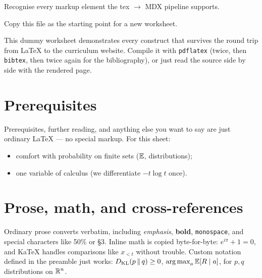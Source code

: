 \begin{learningoutcomes}
  \item Recognise every markup element the tex $\to$ MDX pipeline supports.
  \item Copy this file as the starting point for a new worksheet.
\end{learningoutcomes}

This dummy worksheet demonstrates every construct that survives the round trip
from \LaTeX{} to the curriculum website. Compile it with \texttt{pdflatex}
(twice, then \texttt{bibtex}, then twice again for the bibliography), or just
read the source side by side with the rendered page.

\section{Prerequisites}
\label{sec:prereqs}

Prerequisites, further reading, and anything else you want to say are just
ordinary \LaTeX{} — no special markup. For this sheet:
\begin{itemize}
  \item comfort with probability on finite sets ($\mathbb{E}$, distributions);
  \item one variable of calculus (we differentiate $-t \log t$ once).
\end{itemize}

\section{Prose, math, and cross-references}
\label{sec:basics}

Ordinary prose converts verbatim, including \emph{emphasis}, \textbf{bold},
\texttt{monospace}, and special characters like 50\% or \S3. Inline math is
copied byte-for-byte: $e^{i\pi} + 1 = 0$, and KaTeX handles comparisons like
$x_{<t}$ without trouble. Custom notation defined in the preamble just works:
$D_{\mathrm{KL}}\!\left(p \,\middle\|\, q\right) \geq 0$, $\operatorname*{arg\,max}_{a} \mathbb{E}[R \mid a]$, for $p, q$ distributions on
$\mathbb{R}^n$.

